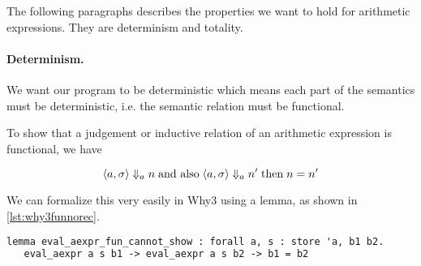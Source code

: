 The following paragraphs describes the properties we want to hold for arithmetic expressions. They are determinism and totality.

\paragraph{Determinism.}
We want our program to be deterministic which means each part of the semantics must be deterministic, i.e. the semantic relation must be functional.

To show that a judgement or inductive relation of an arithmetic expression is functional, we have

\[
  \langle a,\sigma \rangle \Downarrow_{a} n \; \text{and also} \; \langle a,\sigma \rangle \Downarrow_{a} n' \; \text{then} \; n = n'
\]

We can formalize this very easily in Why3 using a lemma, as shown in \autoref{lst:why3funnorec}.

\begin{lstlisting}[caption={lemma for functional arithmetic expressions},label={lst:why3funnorec},language=sml]
lemma eval_aexpr_fun_cannot_show : forall a, s : store 'a, b1 b2.
   eval_aexpr a s b1 -> eval_aexpr a s b2 -> b1 = b2
\end{lstlisting}

